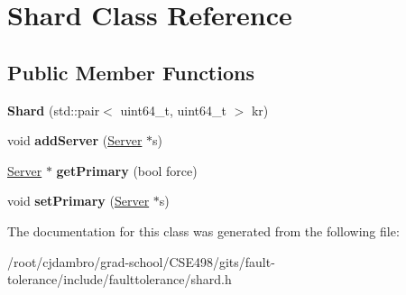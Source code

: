\hypertarget{classShard}{}\section{Shard Class Reference}
\label{classShard}
\subsection*{Public Member Functions}
\begin{DoxyCompactItemize}
\item 
\mbox{\label{classShard_a022ca4cc62df25d9311672c7bec01695}} 
{\bfseries Shard} (std\+::pair$<$ uint64\+\_\+t, uint64\+\_\+t $>$ kr)
\item 
\mbox{\label{classShard_ae55ed3a96bf34e767e3bc836371d6a05}} 
void {\bfseries add\+Server} (\mbox{\hyperlink{classServer}{Server}} $\ast$s)
\item 
\mbox{\label{classShard_a5caa880343d70450edaa632cdc6b2e36}} 
\mbox{\hyperlink{classServer}{Server}} $\ast$ {\bfseries get\+Primary} (bool force)
\item 
\mbox{\label{classShard_a6cf4ee2175ea08b1689b3cd917d39e35}} 
void {\bfseries set\+Primary} (\mbox{\hyperlink{classServer}{Server}} $\ast$s)
\end{DoxyCompactItemize}


The documentation for this class was generated from the following file\+:\begin{DoxyCompactItemize}
\item 
/root/cjdambro/grad-\/school/\+C\+S\+E498/gits/fault-\/tolerance/include/faulttolerance/shard.\+h\end{DoxyCompactItemize}
